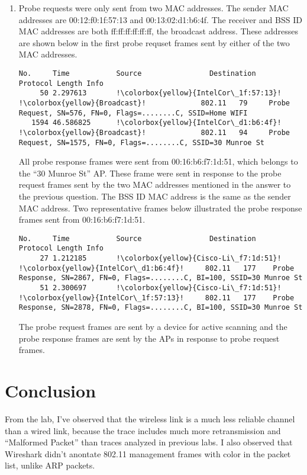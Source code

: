 \documentclass{article}
\begin{document}
\begin{enumerate}
    \item Probe requests were only sent from two MAC addresses. The sender MAC addresses are 00:12:f0:1f:57:13 and 00:13:02:d1:b6:4f. The receiver and BSS ID MAC addresses are both ff:ff:ff:ff:ff:ff, the broadcast address. These addresses are shown below in the first probe requset frames sent by either of the two MAC addresses.
\begin{verbatim}
No.     Time           Source                Destination           Protocol Length Info
     50 2.297613       !\colorbox{yellow}{IntelCor\_1f:57:13}!    !\colorbox{yellow}{Broadcast}!             802.11   79     Probe Request, SN=576, FN=0, Flags=........C, SSID=Home WIFI
   1594 46.586825      !\colorbox{yellow}{IntelCor\_d1:b6:4f}!    !\colorbox{yellow}{Broadcast}!             802.11   94     Probe Request, SN=1575, FN=0, Flags=........C, SSID=30 Munroe St
\end{verbatim}
    
    All probe response frames were sent from 00:16:b6:f7:1d:51, which belongs to the ``30 Munroe St'' AP. These frame were sent in response to the probe request frames sent by the two MAC addresses mentioned in the answer to the previous question. The BSS ID MAC address is the same as the sender MAC address. Two representative frames below illustrated the probe response frames sent from 00:16:b6:f7:1d:51.
\begin{verbatim}
No.     Time           Source                Destination           Protocol Length Info
     27 1.212185       !\colorbox{yellow}{Cisco-Li\_f7:1d:51}!    !\colorbox{yellow}{IntelCor\_d1:b6:4f}!     802.11   177    Probe Response, SN=2867, FN=0, Flags=........C, BI=100, SSID=30 Munroe St
     51 2.300697       !\colorbox{yellow}{Cisco-Li\_f7:1d:51}!    !\colorbox{yellow}{IntelCor\_1f:57:13}!     802.11   177    Probe Response, SN=2878, FN=0, Flags=........C, BI=100, SSID=30 Munroe St
\end{verbatim}

    The probe request frames are sent by a device for active scanning and the probe response frames are sent by the APs in response to probe request frames.

\end{enumerate}

\section{Conclusion}

From the lab, I've observed that the wireless link is a much less reliable channel than a wired link, because the trace includes much more retransmission and ``Malformed Packet'' than traces analyzed in previous labs. I also observed that Wireshark didn't anontate 802.11 management frames with color in the packet list, unlike ARP packets.
\end{document}
